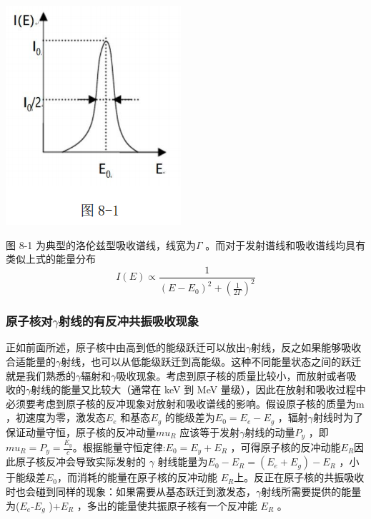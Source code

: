 \documentclass[hyperref]{ctexart}
\begin{document}
\begin{multicols}{2}
	\begin{center}\includegraphics[scale=0.5]{t81.png}\end{center}
	图 8-1 为典型的洛伦兹型吸收谱线，线宽为$\Gamma$ 。而对于发射谱线和吸收谱线均具有类似上式的能量分布
	\begin{equation}
	I(E)\propto \frac{1}{(E-E_0)^2+(\frac{1}{2\Gamma})^2}
	\end{equation}
	
	\subsubsection{原子核对$\gamma$射线的有反冲共振吸收现象}
	正如前面所述，原子核中由高到低的能级跃迁可以放出$\gamma$射线，反之如果能够吸收合适能量的$\gamma$射线，也可以从低能级跃迁到高能级。这种不同能量状态之间的跃迁就是我们熟悉的$\gamma$辐射和$\gamma$吸收现象。考虑到原子核的质量比较小，而放射或者吸收的$\gamma$射线的能量又比较大（通常在 keV 到 MeV 量级），因此在放射和吸收过程中必须要考虑到原子核的反冲现象对放射和吸收谱线的影响。假设原子核的质量为m ，初速度为零，激发态$E_e$ 和基态$E_g$ 的能级差为$E_0=E_e-E_g$ ，辐射$\gamma$射线时为了保证动量守恒，原子核的反冲动量$mu_R$ 应该等于发射$\gamma$射线的动量$P_y$ ，即$mu_R=P_y =\frac{E_y}{c}$。根据能量守恒定律:$E_0 =E_y+ E_R$ ，可得原子核的反冲动能$E_R$因此原子核反冲会导致实际发射的 $\gamma$ 射线能量为$E_0-E_R =(E_e + E_g)-E_R$ ，小于能级差$E_0$，而消耗的能量在原子核的反冲动能 $E_R$上。反正在原子核的共振吸收时也会碰到同样的现象：如果需要从基态跃迁到激发态，$\gamma$射线所需要提供的能量为($E_e$-$E_g$ )+$E_R$ ，多出的能量使共振原子核有一个反冲能 $E_R$ 。


\end{multicols}
\end{document}
